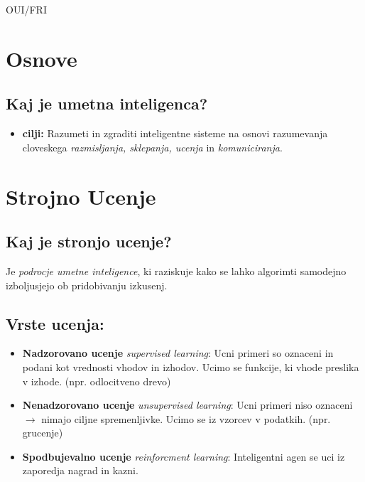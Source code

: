 \documentclass{article}
\begin{document}
\begin{center}
    {\small OUI/FRI \par}
\end{center}


\begin{multicols}{2}

\section{Osnove}

\subsection{Kaj je umetna inteligenca?}
  \begin{itemize} 
    \item  \textbf{cilji:} Razumeti in zgraditi inteligentne sisteme na osnovi razumevanja
      cloveskega \textit{razmisljanja, sklepanja, ucenja} in \textit{komuniciranja}.
  \end{itemize}

\section{Strojno Ucenje}

\subsection{Kaj je stronjo ucenje?}
Je \textit{podrocje umetne inteligence}, ki raziskuje kako se lahko algorimti samodejno izboljusjejo ob pridobivanju izkusenj.

\subsection{Vrste ucenja:}

\begin{itemize}
  \item \textbf{Nadzorovano ucenje} \textit{supervised learning}:
      Ucni primeri so oznaceni in podani kot vrednosti vhodov in izhodov.
      Ucimo se funkcije, ki vhode preslika v izhode. (npr. odlocitveno drevo)
  \item \textbf{Nenadzorovano ucenje} \textit{unsupervised learning}:
      Ucni primeri niso oznaceni $\rightarrow$ nimajo ciljne spremenljivke. Ucimo
      se iz vzorcev v podatkih. (npr. grucenje)
  \item \textbf{Spodbujevalno ucenje} \textit{reinforcment learning}:
      Inteligentni agen se uci iz zaporedja nagrad in kazni.
\end{itemize}


\end{multicols}
\end{document}
